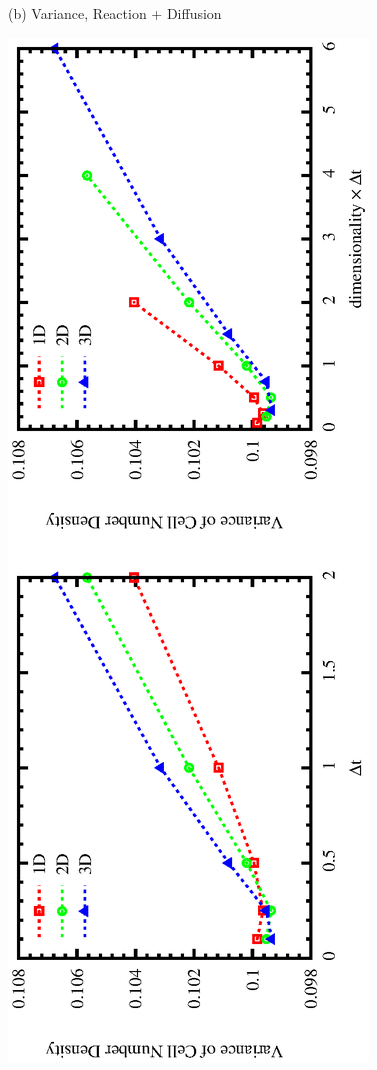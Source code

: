 \documentclass{article}
\begin{document}
\begin{figure}
\begin{center}
(b) Variance, Reaction + Diffusion
\vspace{-5mm}
\end{center}
\includegraphics[angle=270,width=\linewidth]{fig1/var_react.eps}

\end{figure}
\end{document}
